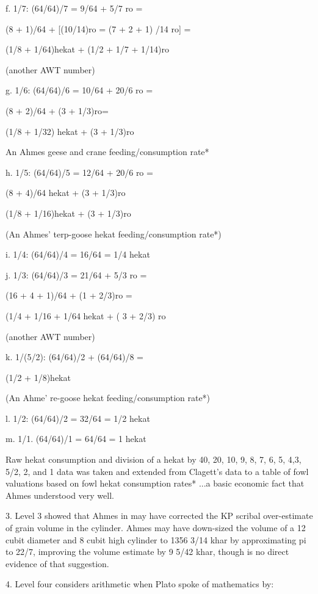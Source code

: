 \documentclass[12pt]{article}
\begin{document}
f. 1/7: (64/64)/7 = 9/64 + 5/7 ro =

(8 + 1)/64 + [(10/14)ro = (7 + 2 + 1) /14 ro] =

(1/8 + 1/64)hekat + (1/2 + 1/7 + 1/14)ro

(another AWT number)

g. 1/6: (64/64)/6 = 10/64 + 20/6 ro =

(8 + 2)/64 + (3 + 1/3)ro=

(1/8 + 1/32) hekat + (3 + 1/3)ro

An Ahmes geese and crane feeding/consumption rate*

h. 1/5: (64/64)/5 = 12/64 + 20/6 ro =

(8 + 4)/64 hekat + (3 + 1/3)ro

(1/8 + 1/16)hekat + (3 + 1/3)ro

(An Ahmes' terp-goose hekat feeding/consumption rate*)

i. 1/4: (64/64)/4 = 16/64 = 1/4 hekat

j. 1/3: (64/64)/3 = 21/64 + 5/3 ro =

(16 + 4 + 1)/64 + (1 + 2/3)ro =

(1/4 + 1/16 + 1/64 hekat + ( 3 + 2/3) ro

(another AWT number)

k. 1/(5/2): (64/64)/2 + (64/64)/8 =

(1/2 + 1/8)hekat

(An Ahme' re-goose hekat feeding/consumption rate*)

l. 1/2: (64/64)/2 = 32/64 = 1/2 hekat

m. 1/1. (64/64)/1 = 64/64 = 1 hekat

Raw  hekat consumption and division of a hekat by 40, 20, 10,  9, 8, 7, 6, 5, 4,3, 5/2, 2, and 1 data was  taken and extended from Clagett's data  to a table of fowl valuations based on fowl hekat consumption rates* ...a basic economic fact that Ahmes understood very well.

3. Level 3 showed that Ahmes in  may have corrected the KP scribal over-estimate of grain volume in the cylinder. Ahmes may have down-sized the volume of a 12 cubit diameter and 8 cubit high cylinder to 1356 3/14 khar by approximating pi to 22/7, improving the volume estimate by 9 5/42 khar, though is no direct evidence of that suggestion.

4. Level four considers  arithmetic
when Plato spoke of mathematics by:
\end{document}
